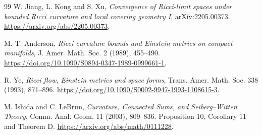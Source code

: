 \documentclass[UTF8,a4paper,11pt,fontset=fandol]{ctexart}
\numberwithin{equation}{section}
\theoremstyle{definition}
\begin{document}
\begin{thebibliography}{99}
 W. Jiang, L. Kong and S. Xu, \emph{Convergence of Ricci-limit spaces under bounded Ricci curvature and local covering geometry I}, arXiv:2205.00373. \url{https://arxiv.org/abs/2205.00373}.

 M. T. Anderson, \emph{Ricci curvature bounds and Einstein metrics on compact manifolds}, J. Amer. Math. Soc. 2 (1989), 455--490. \url{https://doi.org/10.1090/S0894-0347-1989-0999661-1}.

 R. Ye, \emph{Ricci flow, Einstein metrics and space forms}, Trans. Amer. Math. Soc. 338 (1993), 871--896. \url{https://doi.org/10.1090/S0002-9947-1993-1108615-3}.

 M. Ishida and C. LeBrun, \emph{Curvature, Connected Sums, and Seiberg--Witten Theory}, Comm. Anal. Geom. 11 (2003), 809--836. Proposition 10, Corollary 11 and Theorem D. \url{https://arxiv.org/abs/math/0111228}.

\end{thebibliography}
\end{document}
